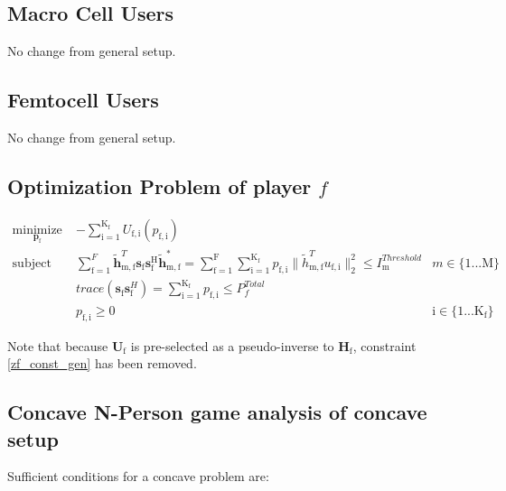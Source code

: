 \documentclass[12pt,a4paper]{report}
\begin{document}
\subsection{Macro Cell Users}
No change from general setup.

\subsection{Femtocell Users}
No change from general setup.



\subsection{Optimization Problem of player $f$}\label{conproblem}


	\begin{subequations}
	\label{optim}
	\begin{align}
	    \underset{\mathbf{p}_{\mathrm{f}} }{\text{minimize}} \;
	    & - \sum_{\mathrm{i=1}}^{\mathrm{K_f}}
    	U_{\mathrm{f,i}}(p_{\mathrm{f,i}}) \label{player_opt_c} \\
	    \text{subject to} \; &
	  \sum^F_{\text{f}=1} \mathbf{\tilde{h}}_{\mathrm{m,f}}^T  \mathbf{s}_{\mathrm{f}} 						
	\mathbf{s_{\mathrm{f}}^{\mathrm{H}}} \mathbf{\tilde{h}_{\mathrm{m,f}}^*} 
	=
	\sum_{\mathrm{f=1}}^{\mathrm{F}}	\sum_{\mathrm{i=1}}^{\mathrm{K_f}}
	p_{\mathrm{f,i}}\|\tilde{h}_{\mathrm{m,f}}^T u_{\mathrm{f,i}}\|^2_2
	\leq I^{Threshold}		
	_{\mathrm{m}} & m \in \{1 ...\text{M}\} 
		\label{interference_const_c}\\
        & trace(\mathbf{s}_\mathrm{f}\mathbf{s}_\mathrm{f}^H) =
        	\sum_{\mathrm{i=1}}^{\mathrm{K_{\mathrm{f}}}} p_{\mathrm{f,i}}
	   \leq P^{Total}_{f}  \label{power_const_c}\\
        & p_{\mathrm{f,i}} \geq 0 &  \text{i} \in \{1 ...\text{K}_{\mathrm{f}}\} \label{pos_power_const_c}
	\end{align}
	\end{subequations}

Note that because $\mathbf{U}_{\mathrm{f}}$ is pre-selected as a pseudo-inverse to  $\mathbf{H_\mathrm{f}}$, constraint \eqref{zf_const_gen} has been removed.

\subsection{Concave N-Person game analysis of concave setup}

Sufficient conditions for a concave problem are:
\end{document}
